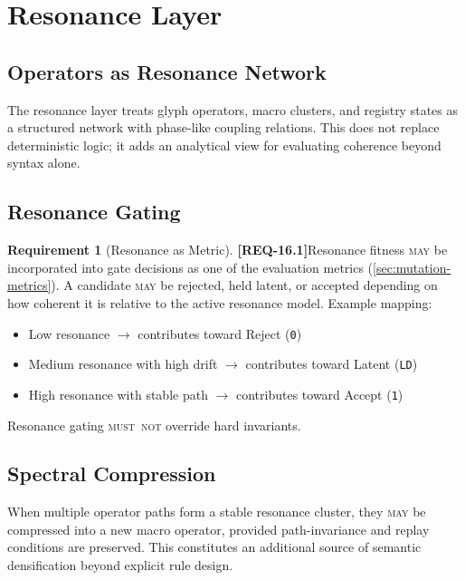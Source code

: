 \documentclass[11pt,a4paper,twoside]{article}
\theoremstyle{definition}
\newtheorem{requirement}{Requirement}[section]
\theoremstyle{remark}
\newcommand{\req}[1]{\textbf{\textcolor{reqred}{[REQ-#1]}}}
\newcommand{\mustnot}{\textsc{must~not}}
\newcommand{\may}{\textsc{may}}
\begin{document}

\section{Resonance Layer}
\label{sec:resonance}

\subsection{Operators as Resonance Network}

The resonance layer treats glyph operators, macro clusters, and registry states as a structured network with phase-like coupling relations. This does not replace deterministic logic; it adds an analytical view for evaluating coherence beyond syntax alone.

\subsection{Resonance Gating}

\begin{requirement}[Resonance as Metric]
\label{req:resonance-metric}
\req{16.1}\quad Resonance fitness \may{} be incorporated into gate decisions as one of the evaluation metrics (\cref{sec:mutation-metrics}). A candidate \may{} be rejected, held latent, or accepted depending on how coherent it is relative to the active resonance model. Example mapping:
\begin{itemize}[nosep]
  \item Low resonance $\to$ contributes toward Reject (\texttt{0})
  \item Medium resonance with high drift $\to$ contributes toward Latent (\texttt{LD})
  \item High resonance with stable path $\to$ contributes toward Accept (\texttt{1})
\end{itemize}
Resonance gating \mustnot{} override hard invariants.
\end{requirement}

\subsection{Spectral Compression}

When multiple operator paths form a stable resonance cluster, they \may{} be compressed into a new macro operator, provided path-invariance and replay conditions are preserved. This constitutes an additional source of semantic densification beyond explicit rule design.
\end{document}
